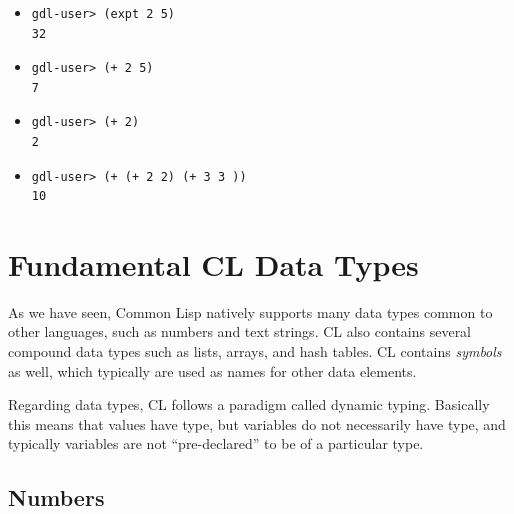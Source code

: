 \documentclass [11pt]{book}
\begin{document}
\begin{itemize}
\begin{itemize}

\item 

\begin{verbatim}gdl-user> (expt 2 5)
32
\end{verbatim}

\item 

\begin{verbatim}gdl-user> (+ 2 5)
7
\end{verbatim}

\item 

\begin{verbatim}gdl-user> (+ 2)
2
\end{verbatim}

\item 

\begin{verbatim}gdl-user> (+ (+ 2 2) (+ 3 3 ))
10
\end{verbatim}

\end{itemize}



\end{itemize}





\section{Fundamental CL Data Types}

\label{sec:fundamentalcldatatypes}



As we have seen, Common Lisp natively supports
many data types common to other languages, such as numbers and text
strings. CL also contains several compound data types such as lists,
arrays, and hash tables. CL contains \emph{symbols} as well, which typically are used as names for other data elements.



Regarding data types, CL follows a paradigm called dynamic
typing. Basically this means that values have type, but variables do
not necessarily have type, and typically variables are not
``pre-declared'' to be of a particular type.



\subsection{Numbers}
\end{document}
